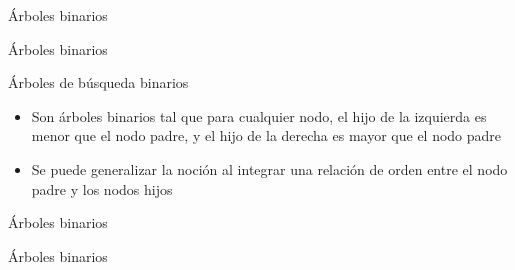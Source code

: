 \documentclass[]{beamer}
\begin{document}
\begin{frame}{\'Arboles binarios}
  
\end{frame}

\begin{frame}{\'Arboles binarios}
  
\end{frame}

\begin{frame}{\'Arboles de b\'usqueda binarios}
  \begin{itemize}
    \item Son \'arboles binarios tal que para cualquier nodo, el hijo de la izquierda es menor que el nodo padre, y el hijo de la derecha es mayor que el nodo padre
      \pause
    \item Se puede generalizar la noci\'on al integrar una relaci\'on de orden entre el nodo padre y los nodos hijos
  \end{itemize}
\end{frame}

\begin{frame}{\'Arboles binarios}
\end{frame}

\begin{frame}{\'Arboles binarios}
  
\end{frame}
\end{document}
